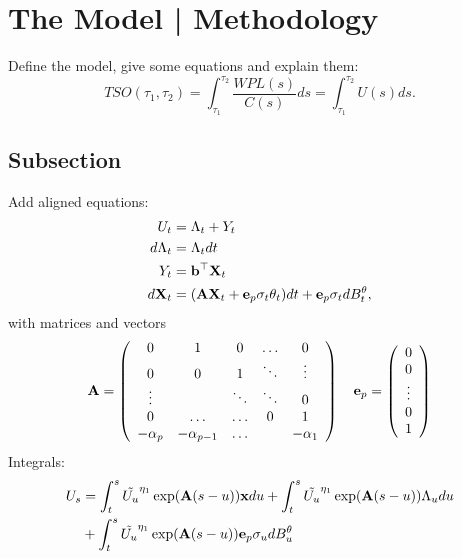 \section{The Model | Methodology} \label{sec:03}
Define the model, give some equations and explain them:
\begin{equation}
TSO(\tau_1, \tau_2) = \int_{\tau_1}^{\tau_2} \frac{WPL(s)}{C(s)}ds = \int_{\tau_1}^{\tau_2} U(s)ds.
\end{equation}

\subsection{Subsection}
Add aligned equations:
\begin{align}
U_t &= \Lambda_t + Y_t\\
d\Lambda_t &= \Lambda_t dt\\
Y_t &= {\bf b}^\top {\bf X}_t\\
d{\bf X}_t &= ({\bf A}{\bf X}_t +  {\bf e}_p\sigma_t\theta_t)dt +  {\bf e}_p \sigma_t dB_t^{\theta},
\end{align}
with matrices and vectors
\[{\bf A} = \left( \begin{array}{ccccc}
0 & 1 & 0 & \ldots& 0\\
0 & 0 & 1 & \ddots& \vdots\\
\vdots &  & \ddots & \ddots &0\\
0 & \ldots & \ldots & 0 & 1\\
-\alpha_p & -\alpha_{p-1} & \ldots & & -\alpha_1 \end{array} \right)\quad {\bf e}_p =  \left( \begin{array}{c} 
0\\
0\\
\vdots\\
0\\
1
\end{array} \right) \]
Integrals:
\begin{align*}
U_s &=  \int_t^{s}\tilde{U_u}^{\eta_1}\exp({\bf A}(s-u)){\bf x}du +  \int_t^{s}\tilde{U_u}^{\eta_1}\exp({\bf A}(s-u))\Lambda_u du   \\
&+  \int_t^{s}\tilde{U_u}^{\eta_1}\exp({\bf A}(s-u)) {\bf e}_p \sigma_u dB_u^\theta
\end{align*}


